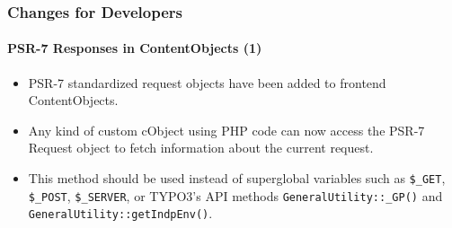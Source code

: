 %

\begin{frame}[fragile]
	\frametitle{Changes for Developers}
	\framesubtitle{PSR-7 Responses in ContentObjects (1)}

	\begin{itemize}
		\item PSR-7 standardized request objects have been added to frontend ContentObjects.
		\item Any kind of custom cObject using PHP code can now access the PSR-7
			Request object to fetch information about the current request.
		\item This method should be used instead of superglobal variables
			such as\newline
			\smaller\texttt{\$\_GET}, \texttt{\$\_POST}, \texttt{\$\_SERVER},\normalsize
			or TYPO3's API methods\newline
			\smaller\texttt{GeneralUtility::\_GP()}\normalsize
			and
			\smaller\texttt{GeneralUtility::getIndpEnv()}\normalsize.

	\end{itemize}
\end{frame}

